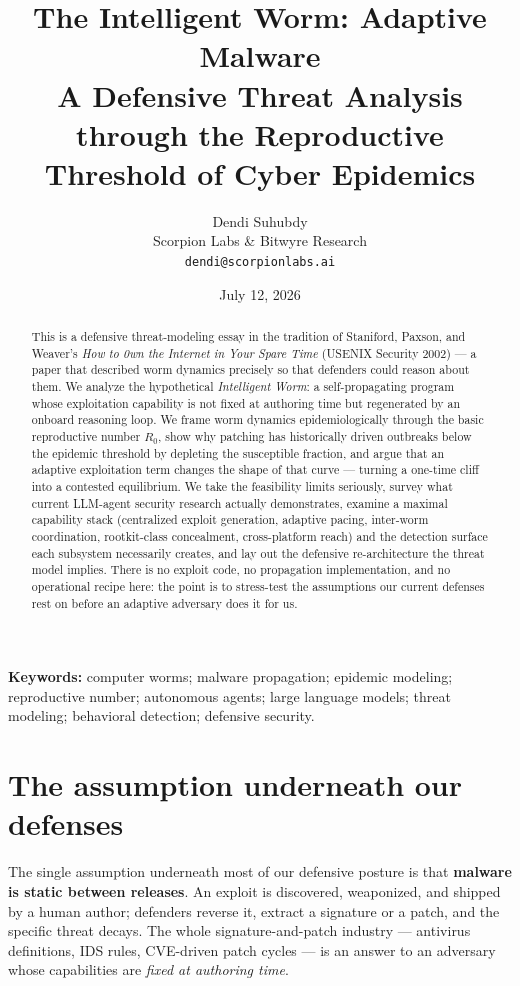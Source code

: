 \documentclass[11pt,a4paper]{article}
\title{\textbf{The Intelligent Worm: Adaptive Malware}\\[2pt]
\large A Defensive Threat Analysis through the Reproductive\\ Threshold of Cyber Epidemics}
\author{Dendi Suhubdy\\\small Scorpion Labs \& Bitwyre Research\\\small\texttt{dendi@scorpionlabs.ai}}
\date{July 12, 2026}
\begin{document}
\maketitle

\begin{abstract}
This is a defensive threat-modeling essay in the tradition of Staniford, Paxson, and Weaver's \emph{How to 0wn the Internet in Your Spare Time} (USENIX Security 2002) --- a paper that described worm dynamics precisely so that defenders could reason about them. We analyze the hypothetical \emph{Intelligent Worm}: a self-propagating program whose exploitation capability is not fixed at authoring time but regenerated by an onboard reasoning loop. We frame worm dynamics epidemiologically through the basic reproductive number $R_0$, show why patching has historically driven outbreaks below the epidemic threshold by depleting the susceptible fraction, and argue that an adaptive exploitation term changes the shape of that curve --- turning a one-time cliff into a contested equilibrium. We take the feasibility limits seriously, survey what current LLM-agent security research actually demonstrates, examine a maximal capability stack (centralized exploit generation, adaptive pacing, inter-worm coordination, rootkit-class concealment, cross-platform reach) and the detection surface each subsystem necessarily creates, and lay out the defensive re-architecture the threat model implies. There is no exploit code, no propagation implementation, and no operational recipe here: the point is to stress-test the assumptions our current defenses rest on before an adaptive adversary does it for us.
\end{abstract}

\medskip
\noindent\textbf{Keywords:} computer worms; malware propagation; epidemic modeling; reproductive number; autonomous agents; large language models; threat modeling; behavioral detection; defensive security.

\section{The assumption underneath our defenses}

The single assumption underneath most of our defensive posture is that \textbf{malware is static between releases}. An exploit is discovered, weaponized, and shipped by a human author; defenders reverse it, extract a signature or a patch, and the specific threat decays. The whole signature-and-patch industry --- antivirus definitions, IDS rules, CVE-driven patch cycles --- is an answer to an adversary whose capabilities are \emph{fixed at authoring time}.
\end{document}
